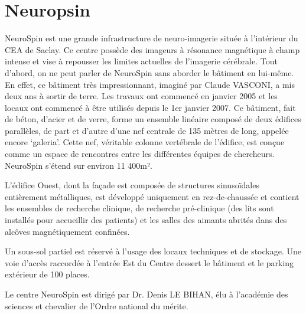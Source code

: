 \section{Neuropsin}

NeuroSpin est une grande infrastructure de neuro-imagerie située à l’intérieur du CEA de Saclay. Ce centre possède des imageurs à résonance magnétique à champ intense et vise à repousser les limites actuelles de l’imagerie cérébrale. Tout d’abord, on ne peut parler de NeuroSpin sans aborder le bâtiment en lui-même. En effet, ce bâtiment très impressionnant, imaginé par Claude VASCONI, a mis deux ans à sortir de terre. Les travaux ont commencé en janvier 2005 et les locaux ont commencé à être utilisés depuis le 1er janvier 2007. Ce bâtiment, fait de béton, d’acier et de verre, forme un ensemble linéaire composé de deux édifices parallèles, de part et d’autre d’une nef centrale de 135 mètres de long, appelée encore ‘galeria’. Cette nef, véritable colonne vertébrale de l’édifice, est conçue comme un espace de rencontres entre les différentes équipes de chercheurs. NeuroSpin s’étend sur environ 11 400m².

L’édifice Ouest, dont la façade est composée de structures sinusoïdales entièrement métalliques, est développé uniquement en rez-de-chaussée et contient les ensembles de recherche clinique, de recherche pré-clinique (des lits sont installés pour accueillir des patients) et les salles des aimants abrités dans des alcôves magnétiquement confinées.

Un sous-sol partiel est réservé à l’usage des locaux techniques et de stockage.
Une voie d’accès raccordée à l’entrée Est du Centre dessert le bâtiment et le parking extérieur de 100 places.

Le centre NeuroSpin est dirigé par Dr. Denis LE BIHAN, élu à l'académie des sciences et chevalier de l'Ordre national du mérite.

